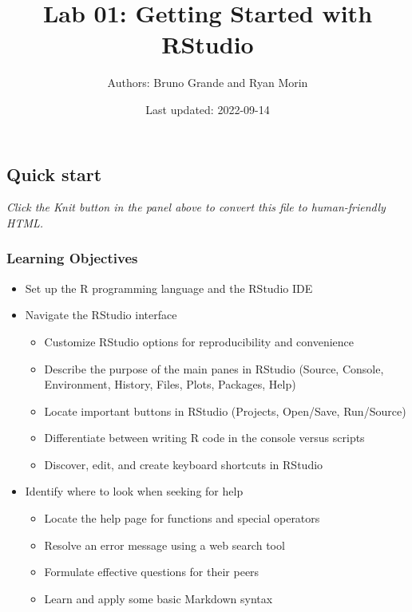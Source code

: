 \documentclass[
]{article}
\title{Lab 01: Getting Started with RStudio}
\author{Authors: Bruno Grande and Ryan Morin}
\date{Last updated: 2022-09-14}
\providecommand{\tightlist}{%
  \setlength{\itemsep}{0pt}\setlength{\parskip}{0pt}}
\begin{document}
\maketitle

\hypertarget{quick-start}{%
\subsection{Quick start}\label{quick-start}}

\emph{Click the Knit button in the panel above to convert this file to
human-friendly HTML.}

\hypertarget{learning-objectives}{%
\subsubsection{Learning Objectives}\label{learning-objectives}}

\begin{itemize}
\tightlist
\item
  Set up the R programming language and the RStudio IDE
\item
  Navigate the RStudio interface

  \begin{itemize}
  \tightlist
  \item
    Customize RStudio options for reproducibility and convenience
  \item
    Describe the purpose of the main panes in RStudio (Source, Console,
    Environment, History, Files, Plots, Packages, Help)
  \item
    Locate important buttons in RStudio (Projects, Open/Save,
    Run/Source)
  \item
    Differentiate between writing R code in the console versus scripts
  \item
    Discover, edit, and create keyboard shortcuts in RStudio
  \end{itemize}
\item
  Identify where to look when seeking for help

  \begin{itemize}
  \tightlist
  \item
    Locate the help page for functions and special operators
  \item
    Resolve an error message using a web search tool
  \item
    Formulate effective questions for their peers
  \item
    Learn and apply some basic Markdown syntax
  \end{itemize}
\end{itemize}
\end{document}
